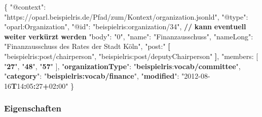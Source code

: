 \documentclass[,a4paper]{article}
\newenvironment{Shaded}{}{}
\newcommand{\DataTypeTok}[1]{\textcolor[rgb]{0.56,0.13,0.00}{{#1}}}
\newcommand{\DecValTok}[1]{\textcolor[rgb]{0.25,0.63,0.44}{{#1}}}
\newcommand{\StringTok}[1]{\textcolor[rgb]{0.25,0.44,0.63}{{#1}}}
\newcommand{\ErrorTok}[1]{\textcolor[rgb]{1.00,0.00,0.00}{\textbf{{#1}}}}
\newcommand{\NormalTok}[1]{{#1}}
\begin{document}
\begin{Shaded}
\begin{Highlighting}[]
\NormalTok{\{}
    \DataTypeTok{"@context"}\NormalTok{: }\StringTok{"https://oparl.beispielris.de/Pfad/zum/Kontext/organization.jsonld"}\NormalTok{,}
    \DataTypeTok{"@type"}\NormalTok{: }\StringTok{"oparl:Organization"}\NormalTok{,}
    \DataTypeTok{"@id"}\NormalTok{: }\StringTok{"beispielris:organization/34"}\NormalTok{,}
      \ErrorTok{//} \ErrorTok{kann} \ErrorTok{eventuell} \ErrorTok{weiter} \ErrorTok{verkürzt} \ErrorTok{werden}
    \DataTypeTok{"body"}\NormalTok{: }\StringTok{"0"}\NormalTok{,}
    \DataTypeTok{"name"}\NormalTok{: }\StringTok{"Finanzausschuss"}\NormalTok{,}
    \DataTypeTok{"nameLong"}\NormalTok{: }\StringTok{"Finanzausschuss des Rates der Stadt Köln"}\NormalTok{,}
    \DataTypeTok{"post:"} \ErrorTok{[}
        \DataTypeTok{"beispielris:post/chairperson"}\NormalTok{,}
        \DataTypeTok{"beispielris:post/deputyChairperson"}
    \ErrorTok{]}\NormalTok{,}
    \DataTypeTok{"members: [}
\DataTypeTok{        "}\ErrorTok{27}\DataTypeTok{",}
\DataTypeTok{        "}\ErrorTok{48}\DataTypeTok{",}
\DataTypeTok{        "}\ErrorTok{57}\DataTypeTok{"}
\DataTypeTok{    ],}
\DataTypeTok{    "}\ErrorTok{organizationType}\DataTypeTok{": "}\ErrorTok{beispielris}\NormalTok{:}\ErrorTok{vocab/committee}\StringTok{",}
\StringTok{    "}\ErrorTok{category}\StringTok{": "}\ErrorTok{beispielris:vocab/finance}\StringTok{",}
\StringTok{    "}\ErrorTok{modified}\StringTok{": "}\DecValTok{2012-08-16}\ErrorTok{T}\DecValTok{14}\ErrorTok{:}\DecValTok{05}\ErrorTok{:}\DecValTok{27}\ErrorTok{+}\DecValTok{02}\ErrorTok{:}\DecValTok{00}\StringTok{"}
\StringTok{\}}
\end{Highlighting}
\end{Shaded}

\subsubsection{Eigenschaften}\label{eigenschaften-2}
\end{document}

